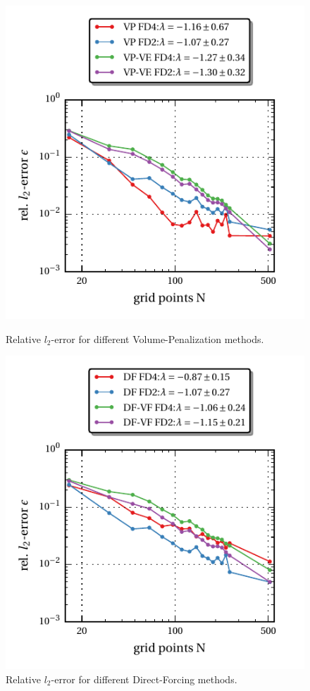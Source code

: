 \clearpage
\begin{figure}[!bp]
  \begin{minipage}[c]{0.45\textwidth}
      \includegraphics{gfx/immersed_boundary/tcflow/theo/vp.pdf}
      \caption{Relative $l_2$-error for different Volume-Penalization methods.}
      \label{vali:tc_flow_gc_vp}
  \end{minipage}
  \hfill
  \begin{minipage}[c]{0.45\textwidth}
      \includegraphics{gfx/immersed_boundary/tcflow/theo/df.pdf}
      \caption{Relative $l_2$-error for different Direct-Forcing methods.}
      \label{vali:tc_flow_gc_df}
  \end{minipage}


\end{figure}
